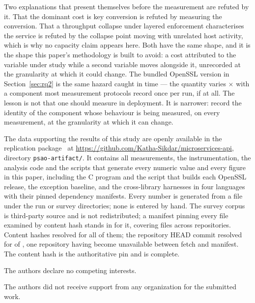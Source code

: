 \documentclass[pdflatex,sn-basic,twocolumn]{sn-jnl}%
\begin{document}
Two explanations that present themselves before the measurement are refuted by
it. That the dominant cost is key conversion is refuted by measuring the
conversion. That a throughput collapse under layered enforcement characterises
the service is refuted by the collapse point moving with unrelated host activity,
which is why no capacity claim appears here. Both have the same shape, and it is
the shape this paper's methodology is built to avoid: a cost attributed to the
variable under study while a second variable moves alongside it, unrecorded at
the granularity at which it could change. The bundled OpenSSL version in
Section~\ref{sec:rq2} is the same hazard caught in time --- the quantity varies
\SpanProbeThrows$\times$ with a component most measurement protocols record once
per run, if at all. The lesson is not that one should measure in deployment. It
is narrower: record the identity of the component whose behaviour is being
measured, on every measurement, at the granularity at which it can change.

\backmatter

The data supporting the results of this study are openly available in the
replication package~\citep{artifact2026} at
\url{https://github.com/Katha-Sikdar/microservices-api}, directory
\texttt{psao-artifact/}. It contains all measurements, the instrumentation,
the analysis code and the scripts that generate every numeric value and every
figure in this paper, including the C program and the script that builds each
OpenSSL release, the exception baseline, and the cross-library harnesses in four
languages with their pinned dependency manifests. Every number is generated from a file under the run or
survey directories; none is entered by hand. The survey corpus is third-party
source and is not redistributed; a manifest pinning every file examined by
content hash stands in for it, covering \ManifestFiles{} files across
\ManifestRepos{} repositories. Content hashes resolved for all of them; the
repository HEAD commit resolved for \ManifestHeadResolved{} of \ManifestFiles,
one repository having become unavailable between fetch and manifest. The content
hash is the authoritative pin and is complete.

The authors declare no competing interests.

The authors did not receive support from any organization for the submitted
work.
\end{document}
